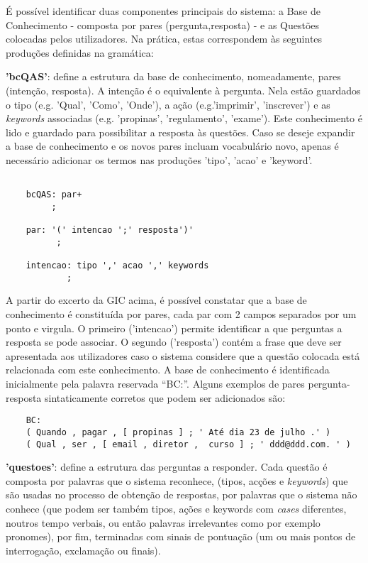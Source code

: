\qquad É possível identificar duas componentes principais do sistema: a Base de Conhecimento - composta por pares (pergunta,resposta) - e as Questões colocadas pelos utilizadores. Na prática, estas correspondem às seguintes produções definidas na gramática:

\medskip \par \textbf{'bcQAS'}: define a estrutura da base de conhecimento, nomeadamente, pares (intenção, resposta). A intenção é o equivalente à pergunta. Nela estão guardados o tipo (e.g. 'Qual', 'Como', 'Onde'), a ação (e.g.'imprimir', 'inscrever') e as \textit{keywords} associadas (e.g. 'propinas', 'regulamento', 'exame'). Este conhecimento é lido e guardado para possibilitar a resposta às questões. Caso se deseje expandir a base de conhecimento e os novos pares incluam vocabulário novo, apenas é necessário adicionar os termos nas produções 'tipo', 'acao' e 'keyword'.

\begin{verbatim}

    bcQAS: par+
         ;

    par: '(' intencao ';' resposta')'  
          ;

    intencao: tipo ',' acao ',' keywords
            ;
\end{verbatim}

A partir do excerto da GIC acima, é possível constatar que a base de conhecimento é constituída por pares, cada par com 2 campos separados por um ponto e virgula. O primeiro ('intencao') permite identificar a que perguntas a resposta se pode associar. O segundo ('resposta') contém a frase que deve ser apresentada aos utilizadores caso o sistema considere que a questão colocada está relacionada com este conhecimento. A base de conhecimento é identificada inicialmente pela palavra reservada ``BC:''. Alguns exemplos de pares pergunta-resposta sintaticamente corretos que podem ser adicionados são:

\begin{verbatim}
    BC:
    ( Quando , pagar , [ propinas ] ; ' Até dia 23 de julho .' )
    ( Qual , ser , [ email , diretor ,  curso ] ; ' ddd@ddd.com. ' )
\end{verbatim}

\medskip\textbf{'questoes'}: define a estrutura das perguntas a responder. Cada questão é composta por palavras que o sistema reconhece, (tipos, acções e \textit{keywords}) que são usadas no processo de obtenção de respostas, por palavras que o sistema não conhece (que podem ser também tipos, ações e keywords com \textit{cases} diferentes, noutros tempo verbais, ou então palavras irrelevantes como por exemplo pronomes), por fim, terminadas com sinais de pontuação (um ou mais pontos de interrogação, exclamação ou finais).

